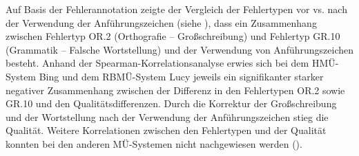 
Auf Basis der Fehlerannotation zeigte der Vergleich der Fehlertypen vor vs. nach der Verwendung der Anführungszeichen (siehe ), dass ein Zusammenhang zwischen Fehlertyp OR.2 (Orthografie -- Großschreibung) und Fehlertyp GR.10 (Grammatik -- Falsche Wortstellung) und der Verwendung von Anführungszeichen besteht. Anhand der Spearman-Korrelationsanalyse erwies sich bei dem HMÜ-System Bing und dem RBMÜ-System Lucy jeweils ein signifikanter starker negativer Zusammenhang zwischen der Differenz in den Fehlertypen OR.2 sowie GR.10 und den Qualitätsdifferenzen. Durch die Korrektur der Großschreibung und der Wortstellung nach der Verwendung der Anführungszeichen stieg die Qualität. Weitere Korrelationen zwischen den Fehlertypen und der Qualität konnten bei den anderen MÜ-Systemen nicht nachgewiesen werden ().



